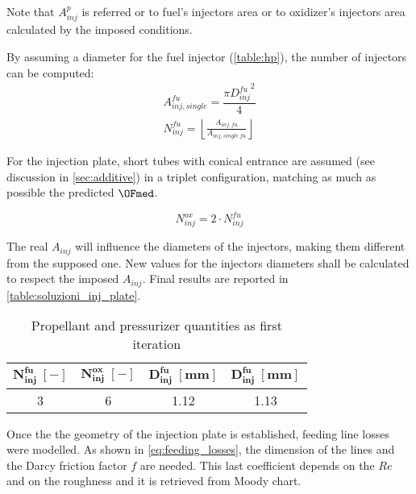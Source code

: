 Note that $A_{inj}^p$ is referred or to fuel's injectors area or to oxidizer's injectors area calculated by the imposed conditions.

By assuming a diameter for the fuel injector (\autoref{table:hp}), the number of injectors can be computed: 
\vspace{-0.5cm}
\begin{gather}
    A_{inj, single}^{fu} = \dfrac{\pi {D_{inj}^{fu}}^2}{4}
    \label{eq:aree_inj}
    \\
    N_{inj}^{fu} = \left\lfloor \frac{A_{inj,fu}}{A_{inj,single\;fu}}\right\rfloor
    \label{eq:number_fu_inj}
\end{gather}

For the injection plate, short tubes with conical entrance are assumed (see discussion in \autoref{sec:additive}) in a triplet configuration, matching as much as possible the predicted $\OFmed$.

\begin{equation}
    N_{inj}^{ox} = 2 \cdot N_{inj}^{fu}
    \label{eq:number_ox_inj}
\end{equation} 

The real $A_{inj}$ will influence the diameters of the injectors, making them different from the supposed one. New values for the injectors diameters shall be calculated to respect the imposed $A_{inj}$. Final results are reported in \autoref{table:soluzioni_inj_plate}.

\begin{table}[H]
    \renewcommand{\arraystretch}{1.4}
    \centering
    \begin{tabular}{|c|c|c|c|}
        \hline
        $\boldsymbol{N_{inj}^{fu}\; [-]}$ & $\boldsymbol{N_{inj}^{ox}\; [-]}$ & $\boldsymbol{D_{inj}^{fu} \; [\textbf{mm}]}$ & $\boldsymbol{D_{inj}^{fu} \; [\textbf{mm}]}$ \\
        \hline
        \hline
        3 & 6 & 1.12 & 1.13 \\
        \hline
    \end{tabular}
    \caption{Propellant and pressurizer quantities as first iteration}
    \label{table:soluzioni_inj_plate}
\end{table}


Once the the geometry of the injection plate is established, feeding line losses were modelled. As shown in \autoref{eq:feeding_losses}, the dimension of the lines and the Darcy friction factor $f$ are needed. This last coefficient depends on the $Re$ and on the roughness and it is retrieved from Moody chart\cite{colebrook}. 

